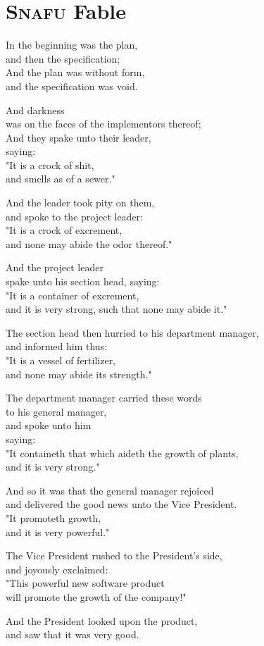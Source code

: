\nomargintoc\chapter{\textsc{Snafu} Fable}
\label{sec:snafu_fable}

In the beginning was the plan,\\
and then the specification;\\
And the plan was without form,\\
and the specification was void.

And darkness\\
was on the faces of the implementors thereof;\\
And they spake unto their leader,\\
saying:\\
"It is a crock of shit,\\
and smells as of a sewer."

And the leader took pity on them,\\
and spoke to the project leader:\\
"It is a crock of excrement,\\
and none may abide the odor thereof."

And the project leader\\
spake unto his section head, saying:\\
"It is a container of excrement,\\
and it is very strong, such that none may abide it."

The section head then hurried to his department manager,\\
and informed him thus:\\
"It is a vessel of fertilizer,\\
and none may abide its strength."

The department manager carried these words\\
to his general manager,\\
and spoke unto him\\
saying:\\
"It containeth that which aideth the growth of plants,\\
and it is very strong."

And so it was that the general manager rejoiced\\
and delivered the good news unto the Vice President.\\
"It promoteth growth,\\
and it is very powerful."

The Vice President rushed to the President's side,\\
and joyously exclaimed:\\
"This powerful new software product\\
will promote the growth of the company!"

And the President looked upon the product,\\
and saw that it was very good.

\cite{noauthor_snafu_nodate}

